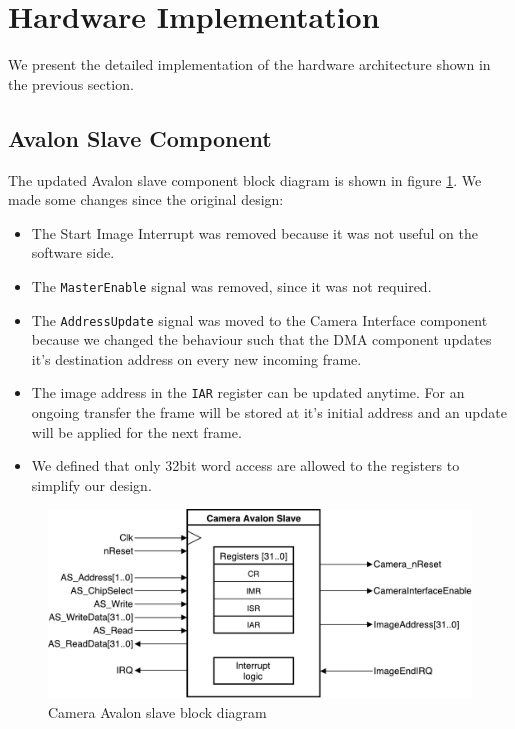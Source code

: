 \documentclass{article}
\begin{document}
\section{Hardware Implementation}

We present the detailed implementation of the hardware architecture shown in the previous section. 

\subsection{Avalon Slave Component}
The updated Avalon slave component block diagram is shown in figure \ref{fig:avalon_slave}. 
We made some changes since the original design:
\begin{itemize}
    \item The Start Image Interrupt was removed because it was not useful on the software side.
    \item The \verb'MasterEnable' signal was removed, since it was not required.
    \item The \verb'AddressUpdate' signal was moved to the Camera Interface component because we changed the behaviour such that the DMA component updates it's destination address on every new incoming frame.
    \item The image address in the \verb'IAR' register can be updated anytime. For an ongoing transfer the frame will be stored at it's initial address and an update will be applied for the next frame.
    \item We defined that only 32bit word access are allowed to the registers to simplify our design.
\end{itemize}

\begin{figure}[H]
\centering
\includegraphics[width=\textwidth]{images/CameraAvalonSlave.pdf}
\caption{Camera Avalon slave block diagram}
\label{fig:avalon_slave}
\end{figure}
\end{document}
